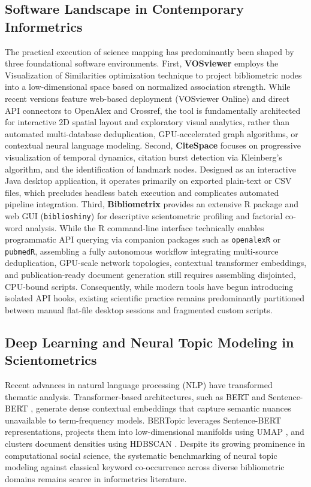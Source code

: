 \documentclass[preprint,12pt]{elsarticle}
\begin{document}
\subsection{Software Landscape in Contemporary Informetrics}
The practical execution of science mapping has predominantly been shaped by three foundational software environments. First, \textbf{VOSviewer} \cite{van2010software, waltman2010unified} employs the Visualization of Similarities optimization technique to project bibliometric nodes into a low-dimensional space based on normalized association strength. While recent versions feature web-based deployment (VOSviewer Online) and direct API connectors to OpenAlex and Crossref, the tool is fundamentally architected for interactive 2D spatial layout and exploratory visual analytics, rather than automated multi-database deduplication, GPU-accelerated graph algorithms, or contextual neural language modeling. Second, \textbf{CiteSpace} \cite{chen2006citespace} focuses on progressive visualization of temporal dynamics, citation burst detection via Kleinberg's algorithm, and the identification of landmark nodes. Designed as an interactive Java desktop application, it operates primarily on exported plain-text or CSV files, which precludes headless batch execution and complicates automated pipeline integration. Third, \textbf{Bibliometrix} \cite{aria2017bibliometrix} provides an extensive R package and web GUI (\texttt{biblioshiny}) for descriptive scientometric profiling and factorial co-word analysis. While the R command-line interface technically enables programmatic API querying via companion packages such as \texttt{openalexR} or \texttt{pubmedR}, assembling a fully autonomous workflow integrating multi-source deduplication, GPU-scale network topologies, contextual transformer embeddings, and publication-ready document generation still requires assembling disjointed, CPU-bound scripts.
Consequently, while modern tools have begun introducing isolated API hooks, existing scientific practice remains predominantly partitioned between manual flat-file desktop sessions and fragmented custom scripts.

\subsection{Deep Learning and Neural Topic Modeling in Scientometrics}
Recent advances in natural language processing (NLP) have transformed thematic analysis. Transformer-based architectures, such as BERT \cite{devlin2018bert} and Sentence-BERT \cite{reimers2019sentence}, generate dense contextual embeddings that capture semantic nuances unavailable to term-frequency models. BERTopic \cite{grootendorst2022bertopic} leverages Sentence-BERT representations, projects them into low-dimensional manifolds using UMAP \cite{mcinnes2018umap}, and clusters document densities using HDBSCAN \cite{campello2013density}. Despite its growing prominence in computational social science, the systematic benchmarking of neural topic modeling against classical keyword co-occurrence across diverse bibliometric domains remains scarce in informetrics literature.
\end{document}
